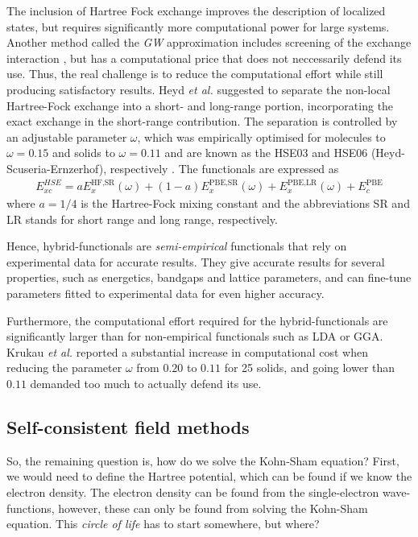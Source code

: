 The inclusion of Hartree Fock exchange improves the description of localized states, but requires significantly more computational power for large systems. Another method called the \textit{GW} approximation includes screening of the exchange interaction \cite{Aryasetiawan1998}, but has a computational price that does not neccessarily defend its use. Thus, the real challenge is to reduce the computational effort while still producing satisfactory results. Heyd \textit{et al.} \cite{Heyd2003} suggested to separate the non-local Hartree-Fock exchange into a short- and long-range portion, incorporating the exact exchange in the short-range contribution. The separation is controlled by an adjustable parameter $\omega$, which was empirically optimised for molecules to $\omega = 0.15$ and solids to $\omega = 0.11$ and are known as the HSE03 and HSE06 (Heyd-Scuseria-Ernzerhof), respectively \cite{Krukau2006}. The functionals are expressed as
\begin{align}
  E_{xc}^{HSE} = aE_{x}^{\text{HF,SR}}(\omega) + (1-a)E_x^{\text{PBE,SR}}(\omega) + E_x^{\text{PBE,LR}}(\omega) + E_c^{\text{PBE}}
\end{align}
where $a=1/4$ is the Hartree-Fock mixing constant and the abbreviations SR and LR stands for short range and long range, respectively.

Hence, hybrid-functionals are \textit{semi-empirical} functionals that rely on experimental data for accurate results. They give accurate results for several properties, such as energetics, bandgaps and lattice parameters, and can fine-tune parameters fitted to experimental data for even higher accuracy.

Furthermore, the computational effort required for the hybrid-functionals are significantly larger than for non-empirical functionals such as LDA or GGA. Krukau \textit{et al.} \cite{Krukau2006} reported a substantial increase in computational cost when reducing the parameter $\omega$ from $0.20$ to $0.11$ for 25 solids, and going lower than $0.11$ demanded too much  to actually defend its use.

\subsection{Self-consistent field methods}

So, the remaining question is, how do we solve the Kohn-Sham equation? First, we would need to define the Hartree potential, which can be found if we know the electron density. The electron density can be found from the single-electron wave-functions, however, these can only be found from solving the Kohn-Sham equation. This \textit{circle of life} has to start somewhere, but where?

